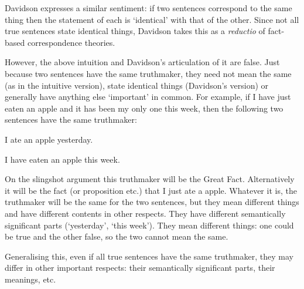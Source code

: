 Davidson expresses a similar sentiment: if two sentences correspond to the same thing then the statement of each is `identical' with that of the other.
Since not all true sentences state identical things, Davidson takes this as a \textit{reductio} of fact-based correspondence theories.
\parencite[750]{Davidson_1969}

However, the above intuition and Davidson's articulation of it are false.
Just because two sentences have the same truthmaker, they need not mean the same (as in the intuitive version), state identical things (Davidson's version) or generally have anything else `important' in common.
For example, if I have just eaten an apple and it has been my only one this week, then the following two sentences have the same truthmaker:

	\begin{example}\label{yesterday}
	I ate an apple yesterday.
	\end{example}

	\begin{example}\label{week}
	I have eaten an apple this week.
	\end{example}

On the slingshot argument this truthmaker will be the Great Fact.
Alternatively it will be the fact (or proposition etc.) that I just ate a apple.
Whatever it is, the truthmaker will be the same for the two sentences, but they mean different things and have different contents in other respects.
They have different semantically significant parts (`yesterday', `this week').
They mean different things: one could be true and the other false, so the two cannot mean the same.

Generalising this, even if all true sentences have the same truthmaker, they may differ in other important respects: their semantically significant parts, their meanings, etc.

